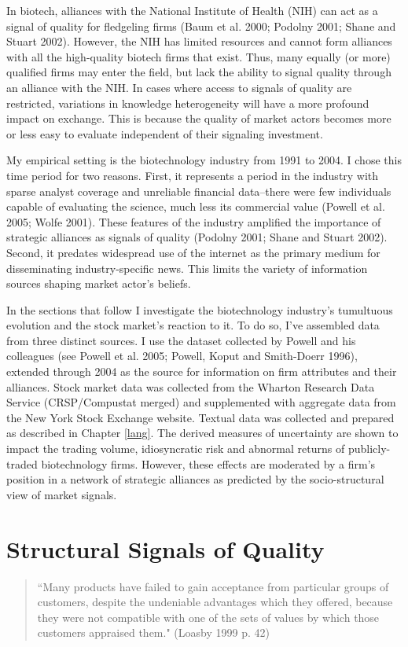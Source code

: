 In biotech, alliances with the National Institute of Health (NIH) can act as a signal of quality for fledgeling firms (Baum et al. 2000; Podolny 2001; Shane and Stuart 2002). However, the NIH has limited resources and cannot form alliances with all the high-quality biotech firms that exist. Thus, many equally (or more) qualified firms may enter the field, but lack the ability to signal quality through an alliance with the NIH. In cases where access to signals of quality are restricted, variations in knowledge heterogeneity will have a more profound impact on exchange. This is because the quality of market actors becomes more or less easy to evaluate independent of their signaling investment. 

My empirical setting is the biotechnology industry from 1991 to 2004. I chose this time period for two reasons. First, it represents a period in the industry with sparse analyst coverage and unreliable financial data--there were few individuals capable of evaluating the science, much less its commercial value (Powell et al. 2005; Wolfe 2001). These features of the industry amplified the importance of strategic alliances as signals of quality (Podolny 2001; Shane and Stuart 2002). Second, it predates widespread use of the internet as the primary medium for disseminating industry-specific news. This limits the variety of information sources shaping market actor's beliefs.

In the sections that follow I investigate the biotechnology industry's tumultuous evolution and the stock market's reaction to it. To do so, I've assembled data from three distinct sources. I use the dataset collected by Powell and his colleagues (see Powell et al. 2005; Powell, Koput and Smith-Doerr 1996), extended through 2004 as the source for information on firm attributes and their alliances. Stock market data was collected from the Wharton Research Data Service (CRSP/Compustat merged) and supplemented with aggregate data from the New York Stock Exchange website. Textual data was collected and prepared as described in Chapter \ref{lang}. The derived measures of uncertainty are shown to impact the trading volume, idiosyncratic risk and abnormal returns of publicly-traded biotechnology firms. However, these effects are moderated by a firm's position in a network of strategic alliances as predicted by the socio-structural view of market signals.

\section{Structural Signals of Quality}
\begin{small}
\begin{quote}
``Many products have failed to gain acceptance from particular groups of customers, despite the undeniable advantages which they offered, because they were not compatible with one of the sets of values by which those customers appraised them." (Loasby 1999 p. 42) 
\end{quote}
\end{small}

